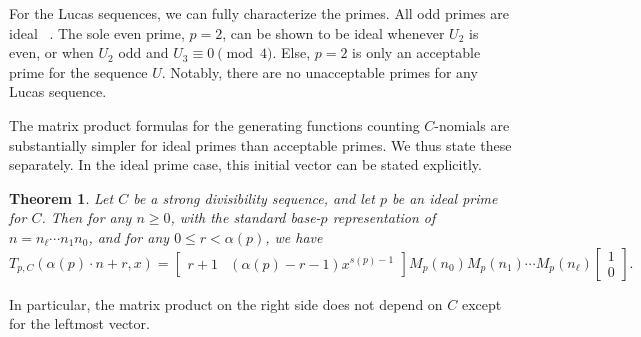 \documentclass{amsart}
\newtheorem{theorem}{Theorem}
\theoremstyle{definition}
\begin{document}
For the Lucas sequences, we can fully characterize the primes. All odd primes are ideal ~\cite[Exercise 3.2.2-11]{TAOCP}. The sole even prime, $p=2$, can be shown to be ideal whenever $U_2$ is even, or when $U_2$ odd and $U_3 \equiv 0 \pmod 4$. Else, $p=2$ is only an acceptable prime for the sequence $U$. Notably, there are no unacceptable primes for any Lucas sequence.

The matrix product formulas for the generating functions counting $C$-nomials are substantially simpler for ideal primes than acceptable primes. We thus state these separately.
In the ideal prime case, this initial vector can be stated explicitly. 

\begin{theorem}\label{thm:ideal_cnomial}
Let $ C $ be a strong divisibility sequence, and let $ p $ be an ideal prime for $ C $. Then for any $ n \geq 0 $, with the standard base-$p$ representation of $n = n_{\ell}\cdots n_1n_0$, and for any $ 0 \leq r < \alpha(p) $, we have 
\[
T_{p,C}(\alpha(p) \cdot n + r, x)
= \begin{bmatrix}
    r+1&(\alpha(p) - r - 1)x^{s(p) - 1}
\end{bmatrix} M_p(n_0) M_p(n_1) \cdots M_p(n_\ell) \begin{bmatrix} 1 \\ 0 \end{bmatrix}.
\]
\end{theorem}
In particular, the matrix product on the right side does not depend on $C$ except for the leftmost vector.
\end{document}
